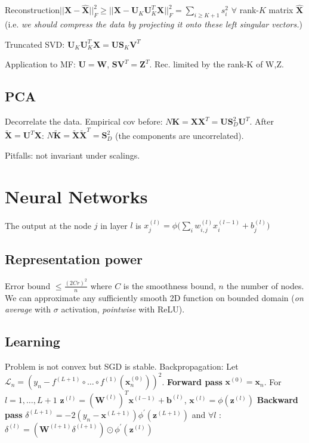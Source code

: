 Reconstruction\newline $||\mathbf{X}-\mathbf{\hat{X}}||_F^2 \ge ||\mathbf{X}-\mathbf{U}_K\mathbf{U}_K^T\mathbf{X}||_F^2 = \underset{i\ge K+1}{\sum} s_i^2$ 
\newline$\forall$ rank-$K$ matrix $\mathbf{\hat{X}}$ (i.e. \textit{we should compress the data by projecting it onto these left singular vectors.})

Truncated SVD: $\mathbf{U}_K \mathbf{U}_K^T \mathbf{X} = \mathbf{U} \mathbf{S}_K \mathbf{V}^T$

Application to MF: $\mathbf{U} = \mathbf{W}$, $\mathbf{S}\mathbf{V}^T = \mathbf{Z}^T$. Rec. limited by the rank-K of W,Z.

\subsection{PCA}
Decorrelate the data. Empirical cov before: $N\mathbf{K} = \mathbf{X}\mathbf{X}^T = \mathbf{U}\mathbf{S}_D^2\mathbf{U}^T$.
After $\mathbf{\tilde{X}} = \mathbf{U}^T\mathbf{X}$: $N\mathbf{\tilde{K}} = \mathbf{\tilde{X}}\mathbf{\tilde{X}}^T = \mathbf{S}_D^2$ (the components are uncorrelated).

Pitfalls: not invariant under scalings.

\section{Neural Networks}
The output at the node $j$ in layer $l$ is $x_j^{(l)} = \phi \big(\sum_i w_{i,j}^{(l)}x_i^{(l-1)} + b_j^{(l)} \big)$
\subsection{Representation power}
Error bound $\le \frac{(2Cr)^2}{n}$ where $C$ is the smoothness bound, $n$ the number of nodes. We can approximate any sufficiently smooth 2D function on bounded domain (\textit{on average} with $\sigma$ activation, \textit{pointwise} with ReLU).
\subsection{Learning}
Problem is not convex but SGD is stable. Backpropagation:
Let $\mathcal{L}_n = (y_n - f^{(L+1)} \circ \dots \circ f^{(1)}(\mathbf{x}^{(0)}_n))^2$.\newline
\textbf{Forward pass} \newline $\mathbf{x}^{(0)}=\mathbf{x}_n$. For $l=1,\dots,L+1$ \newline
$\mathbf{z}^{(l)} = (\mathbf{W}^{(l)})^T\mathbf{x}^{(l-1)}+\mathbf{b}^{(l)}$, $\mathbf{x}^{(l)} = \phi(\mathbf{z}^{(l)})$\newline
\textbf{Backward pass} \newline $\delta^{(L+1)} = -2(y_n-\mathbf{x}^{(L+1)})\phi^{'}(\mathbf{z}^{(L+1)})$ and $\forall l$ :
$\delta^{(l)} = (\mathbf{W}^{(l+1)}\delta^{(l+1)}) \odot \phi^{'}(\mathbf{z}^{(l)})$ \newline

